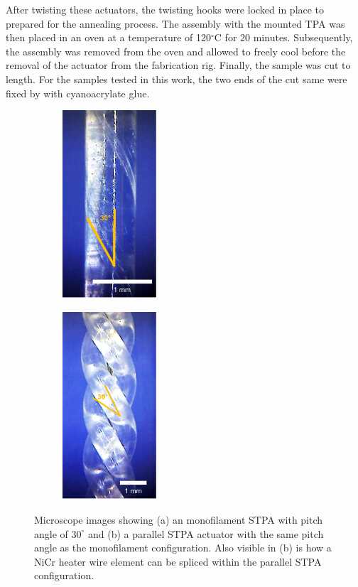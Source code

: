 \documentclass[twocolumn,10pt]{asme2e}
\begin{document}
After twisting these actuators, the twisting hooks were locked in place to prepared for the annealing process. The assembly with the mounted TPA was then placed in an oven at a temperature of 120$^\circ$C for 20 minutes. Subsequently, the assembly was removed from the oven and allowed to freely cool before the removal of the actuator from the fabrication rig. Finally, the sample was cut to length. For the samples tested in this work, the two ends of the cut same were fixed by with cyanoacrylate glue. 

\begin{figure}
    \centering
     \begin{subfigure}[b]{0.15\textwidth}
        \includegraphics[width=3.5cm]{../Images/micro_mono.pdf}
        \caption{}
        \label{fig:miro_mono}
        \end{subfigure}
        \quad \quad  \quad \quad
     \begin{subfigure}[b]{0.15\textwidth}
        \includegraphics[width=3.5cm]{../Images/micro_para.pdf}
        \caption{}
        \label{fig:micro_para}
        \end{subfigure}
        \caption{Microscope images showing (a) an monofilament STPA with pitch angle of $30^\circ$ and (b) a parallel STPA actuator with the same pitch angle as the monofilament configuration. Also visible in (b) is how a NiCr heater wire element can be spliced within the parallel STPA configuration.  }
        \label{fig:micro}
\end{figure}
\end{document}

